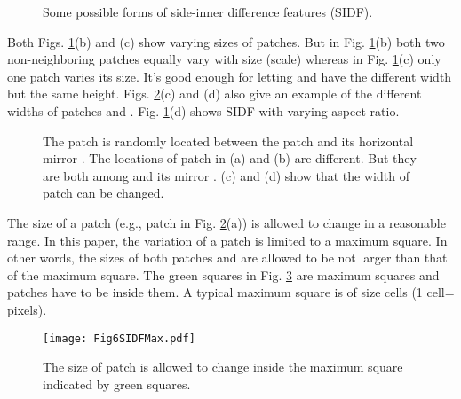 \documentclass[10pt,twocolumn,letterpaper]{article}
\begin{document}
\begin{figure}[!t]
\centering
{}
\hfil
{}
\hfil
{}
\hfil
{}
\caption{Some possible forms of side-inner difference features (SIDF). }
\label{FigFormsSIDF}
\end{figure}

Both Figs. \ref{FigFormsSIDF}(b) and (c) show varying sizes of patches. But in Fig. \ref{FigFormsSIDF}(b) both 
two non-neighboring patches equally vary with size (scale) whereas in Fig. 
\ref{FigFormsSIDF}(c) only one patch varies its size. It's good enough for letting  and  have the different width but the same height. Figs. \ref{FigLocBSIDF}(c) and (d) also give an example of the different widths of patches  and . Fig. \ref{FigFormsSIDF}(d) shows SIDF with varying aspect ratio.

\begin{figure}[!t]
\centering
{}
\hfil
{}
\hfil
{}
\hfil
{}
\caption{The patch  is randomly located between the patch  and its horizontal mirror . The locations of patch  in (a) and (b) are different. But they are both among  and its mirror . (c) and (d) show that the width of patch  can be changed.  }
\label{FigLocBSIDF}
\end{figure}

The size of a patch (e.g., patch  in Fig. \ref{FigLocBSIDF}(a)) is allowed to change in a reasonable range. In this paper, the variation of a patch is limited to a maximum square. In other words, the sizes of both patches  and  are allowed to be not larger than that of the maximum square. The green squares in Fig. \ref{FigSIDFMax} are maximum squares and patches have to be inside them. A typical maximum square is of size  cells (1 cell= pixels). 

\begin{figure}[!t]
\centering
\texttt{[image: Fig6SIDFMax.pdf]}
\caption{The size of patch  is allowed to change inside the maximum square indicated by green squares.}
\label{FigSIDFMax}
\end{figure}
\end{document}
